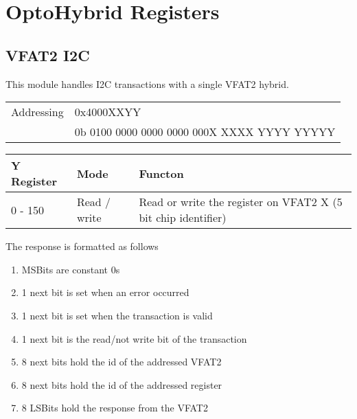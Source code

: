 \chapter{OptoHybrid Registers}
\label{chap:A-registers}

  \section{VFAT2 I2C}

    This module handles I2C transactions with a single VFAT2 hybrid.

    \begin{tabularx}{\textwidth}{L{0.5}L{1.5}}
      Addressing & 0x4000XXYY \\
      & 0b 0100 0000 0000 0000 000X XXXX YYYY YYYYY
    \end{tabularx}

    \begin{tabularx}{\textwidth}{L{0.5}L{0.5}L{2}}
      \textbf{Y Register} & \textbf{Mode} & \textbf{Functon} \\  - 150 & Read / write & Read or write the register on VFAT2 X (5 bit chip identifier)
    \end{tabularx}

    The response is formatted as follows
    \begin{enumerate}
      \item MSBits are constant 0s
      \item 1 next bit is set when an error occurred
      \item 1 next bit is set when the transaction is valid
      \item 1 next bit is the read/not write bit of the transaction
      \item 8 next bits hold the id of the addressed VFAT2
      \item 8 next bits hold the id of the addressed register
      \item 8 LSBits hold the response from the VFAT2
    \end{enumerate}
